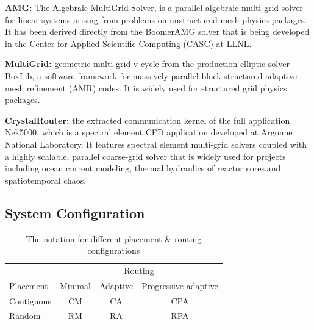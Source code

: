 \documentclass[conference,compsoc]{IEEEtran}
\begin{document}
\textbf{AMG:} The Algebraic MultiGrid Solver, is a parallel algebraic multi-grid solver for linear systems arising from problems on unstructured mesh physics packages. It has been derived directly from the BoomerAMG solver that is being developed in the Center for Applied Scientific Computing (CASC) at LLNL\cite{amg}. 

\textbf{MultiGrid:}  geometric multi-grid v-cycle from the production elliptic solver BoxLib, a software framework for massively parallel block-structured adaptive mesh refinement (AMR) codes\cite{boxlib}. It is widely used for structured grid physics packages. 

\textbf{CrystalRouter:} the extracted communication kernel of the full application Nek5000\cite{nek5000}, which is a spectral element CFD application developed at Argonne National Laboratory\cite{crystalrouter}. It features spectral element multi-grid solvers coupled with a highly scalable, parallel coarse-grid solver that is widely used for projects including ocean current modeling, thermal hydraulics of reactor cores,and spatiotemporal chaos. 



\subsection{System Configuration}
\label{sec: simulation configuration}


\begin{table}[ht]
\begin{center}
\caption{The notation for different placement \& routing configurations} 
\label{tab: placement routing configs}
\begin{tabular}{l c c c }
\toprule %
\toprule
&\multicolumn{3}{c}{Routing} \\ %
\cmidrule(l){2-4}
Placement  & Minimal & Adaptive & Progressive adaptive\\ %
\midrule %
Contiguous  &  CM   &   CA   &  CPA   \\ %
\midrule
Random  &   RM  &   RA   &  RPA   \\ 

\midrule %
\bottomrule %
\end{tabular}
\end{center}
\end{table}
\end{document}
